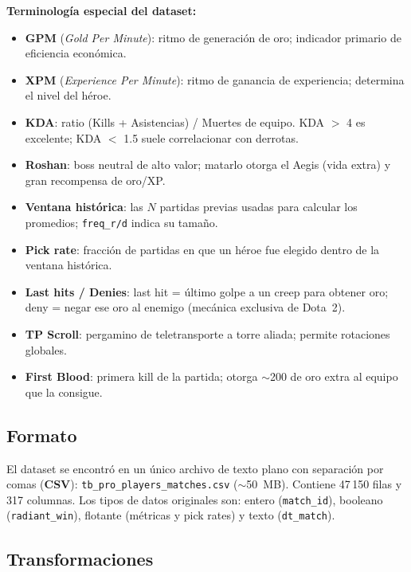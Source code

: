 \documentclass[12pt,a4paper]{article}
\begin{document}
\textbf{Terminolog\'ia especial del dataset:}
\begin{itemize}
  \item \textbf{GPM} (\textit{Gold Per Minute}): ritmo de generaci\'on de oro;
        indicador primario de eficiencia econ\'omica.
  \item \textbf{XPM} (\textit{Experience Per Minute}): ritmo de ganancia de
        experiencia; determina el nivel del h\'eroe.
  \item \textbf{KDA}: ratio (Kills + Asistencias) / Muertes de equipo.
        KDA $>$ 4 es excelente; KDA $<$ 1.5 suele correlacionar con derrotas.
  \item \textbf{Roshan}: boss neutral de alto valor; matarlo otorga el Aegis
        (vida extra) y gran recompensa de oro/XP.
  \item \textbf{Ventana hist\'orica}: las $N$ partidas previas usadas para
        calcular los promedios; \texttt{freq\_r/d} indica su tama\~no.
  \item \textbf{Pick rate}: fracci\'on de partidas en que un h\'eroe fue elegido
        dentro de la ventana hist\'orica.
  \item \textbf{Last hits / Denies}: last hit = \'ultimo golpe a un creep para
        obtener oro; deny = negar ese oro al enemigo (mec\'anica exclusiva de
        Dota~2).
  \item \textbf{TP Scroll}: pergamino de teletransporte a torre aliada; permite
        rotaciones globales.
  \item \textbf{First Blood}: primera kill de la partida; otorga $\sim$200 de
        oro extra al equipo que la consigue.
\end{itemize}

\subsection{Formato}

El dataset se encontr\'o en un \'unico archivo de texto plano con separaci\'on por
comas (\textbf{CSV}): \texttt{tb\_pro\_players\_matches.csv} ($\sim$50~MB).
Contiene 47\,150 filas y 317 columnas. Los tipos de datos originales son:
entero (\texttt{match\_id}), booleano (\texttt{radiant\_win}), flotante (m\'etricas
y pick rates) y texto (\texttt{dt\_match}).

\subsection{Transformaciones}
\end{document}
